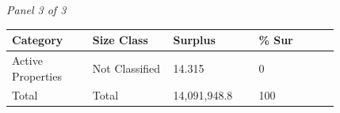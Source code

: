 \documentclass[12pt]{article}
\begin{document}
\begin{landscape}
\begin{table}[H]
\vspace{0.6em}

\textit{Panel 3 of 3}\\[2pt]
{\fontsize{12}{14}\selectfont
\setlength{\tabcolsep}{3pt}
\renewcommand{\arraystretch}{1.08}
\begin{tabular}{p{0.205\linewidth}p{0.205\linewidth}p{0.205\linewidth}p{0.205\linewidth}}
\toprule
Category & Size Class & Surplus & \% Sur \\
\midrule
Active Properties & Not Classified & 14.315 & 0 \\
Total & Total & 14,091,948.8 & 100 \\
\bottomrule
\end{tabular}
}
\end{table}
\end{landscape}
\end{document}
